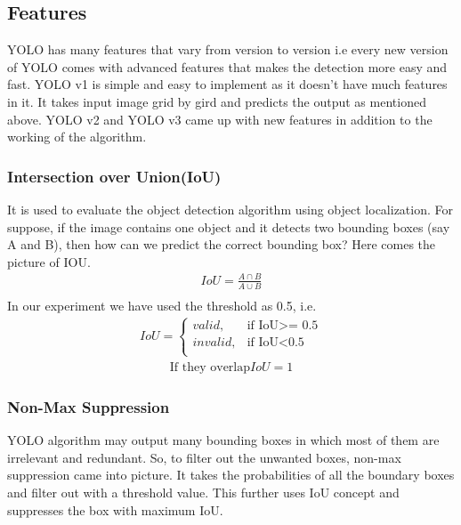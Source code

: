 \documentclass[12pt]{report}
\begin{document}
\subsection{Features}
YOLO has many features that vary from version to version i.e every new version of YOLO comes with advanced features that makes the detection more easy and fast. YOLO v1 is simple and easy to implement as it doesn’t have much features in it. It takes input image grid by gird and predicts the output as mentioned above. YOLO v2 and YOLO v3 came up with new features in addition to the working of the algorithm.
\subsubsection{Intersection over Union(IoU)}
It is used to evaluate the object detection algorithm using object localization. For suppose, if the image contains one object and it detects two bounding boxes (say A and B), then how can we predict the correct bounding box? Here comes the picture of IOU.
\begin{equation}\label{4}
\begin{split}
IoU=\frac{A\cap B}{A\cup B}\\
\end{split}
\end{equation}
In our experiment we have used the threshold as 0.5, i.e. \\
\begin{equation}\label{5}
\begin{split}
IoU=
\begin{cases}
valid, &\text{if IoU>= 0.5}\\
invalid, &\text{if IoU<0.5}\\
\end{cases}
\end{split}
\end{equation}
\begin{equation}\label{1}
\begin{split}
\text{If they overlap} IoU=1
\end{split}
\end{equation}

\subsubsection{Non-Max Suppression}
YOLO algorithm may output many bounding boxes in which most of them are irrelevant and redundant. So, to filter out the unwanted boxes, non-max suppression came into picture. It takes the probabilities of all the boundary boxes and filter out with a threshold value. This further uses IoU concept and suppresses the box with maximum IoU. 
\end{document}

